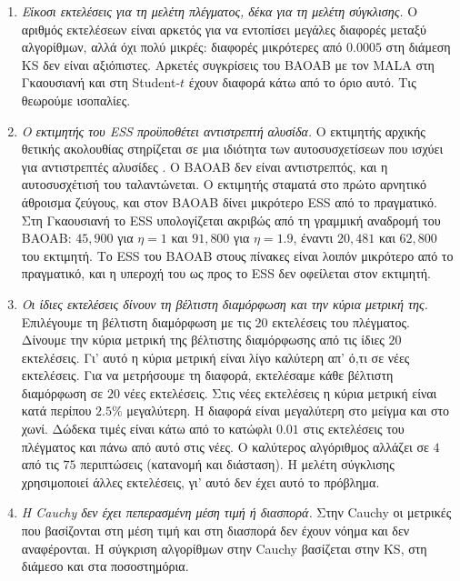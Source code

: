\begin{enumerate}
 \item \emph{Είκοσι εκτελέσεις για τη μελέτη πλέγματος, δέκα για τη
        μελέτη σύγκλισης.} Ο αριθμός εκτελέσεων είναι αρκετός για να                                                          
        εντοπίσει μεγάλες διαφορές μεταξύ αλγορίθμων, αλλά όχι πολύ μικρές:
        διαφορές μικρότερες από $0.0005$ στη διάμεση KS δεν είναι αξιόπιστες.
        Αρκετές συγκρίσεις του BAOAB με τον MALA στη Γκαουσιανή και στη
        Student-$t$ έχουν διαφορά κάτω από το όριο αυτό. Τις θεωρούμε ισοπαλίες.

  \item \emph{Ο εκτιμητής του ESS προϋποθέτει αντιστρεπτή αλυσίδα.} Ο εκτιμητής
        αρχικής θετικής ακολουθίας στηρίζεται σε μια ιδιότητα των αυτοσυσχετίσεων που
        ισχύει για αντιστρεπτές αλυσίδες \citep[Theorem~3.1]{geyer1992practical}. Ο
        BAOAB δεν είναι αντιστρεπτός, και η αυτοσυσχέτισή του ταλαντώνεται. Ο
        εκτιμητής σταματά στο πρώτο αρνητικό άθροισμα ζεύγους, και στον BAOAB δίνει
        μικρότερο ESS από το πραγματικό. Στη Γκαουσιανή το ESS υπολογίζεται ακριβώς
        από τη γραμμική αναδρομή του BAOAB: $45{,}900$ για $\eta = 1$ και $91{,}800$
        για $\eta = 1.9$, έναντι $20{,}481$ και $62{,}800$ του εκτιμητή. Το ESS του
        BAOAB στους πίνακες είναι λοιπόν μικρότερο από το πραγματικό, και η υπεροχή
        του ως προς το ESS δεν οφείλεται στον εκτιμητή.

  \item \emph{Οι ίδιες εκτελέσεις δίνουν τη βέλτιστη διαμόρφωση και την κύρια μετρική
        της.} Επιλέγουμε τη βέλτιστη διαμόρφωση με τις $20$ εκτελέσεις του πλέγματος.
        Δίνουμε την κύρια μετρική της βέλτιστης διαμόρφωσης από τις ίδιες $20$
        εκτελέσεις. Γι' αυτό η κύρια μετρική είναι λίγο καλύτερη απ' ό,τι
        σε νέες εκτελέσεις. Για να μετρήσουμε τη διαφορά,
        εκτελέσαμε κάθε βέλτιστη διαμόρφωση σε $20$ νέες εκτελέσεις. Στις νέες
        εκτελέσεις η κύρια μετρική είναι κατά περίπου $2.5\%$ μεγαλύτερη. Η διαφορά
        είναι μεγαλύτερη στο μείγμα και στο χωνί. Δώδεκα τιμές είναι κάτω από το
        κατώφλι $0.01$ στις εκτελέσεις του πλέγματος και πάνω από αυτό στις νέες. Ο καλύτερος
        αλγόριθμος αλλάζει σε $4$ από τις $75$ περιπτώσεις (κατανομή και διάσταση). Η
        μελέτη σύγκλισης χρησιμοποιεί άλλες εκτελέσεις, γι' αυτό δεν έχει αυτό το
        πρόβλημα.

  \item \emph{Η Cauchy δεν έχει πεπερασμένη μέση τιμή ή διασπορά.} Στην
        Cauchy οι μετρικές που βασίζονται στη μέση τιμή και στη διασπορά
        δεν έχουν νόημα και δεν αναφέρονται. Η σύγκριση
        αλγορίθμων στην Cauchy βασίζεται στην KS, στη διάμεσο και στα
        ποσοστημόρια.


\end{enumerate}
